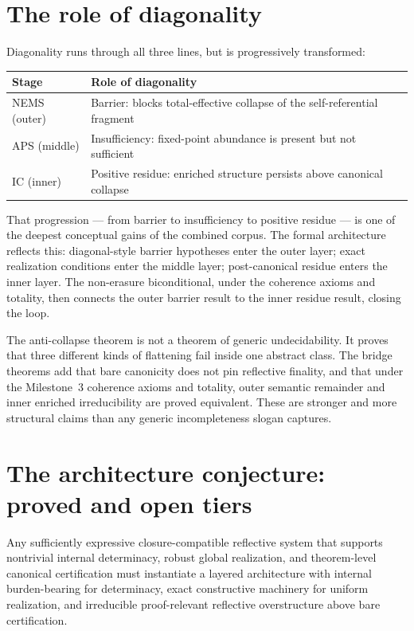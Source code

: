 \documentclass[11pt]{article}
\begin{document}
\section{The role of diagonality}
\label{sec:diagonality}

Diagonality runs through all three lines, but is progressively transformed:

\begin{center}
\begin{tabular}{ll}
\toprule
Stage & Role of diagonality \\
\midrule
NEMS (outer) & Barrier: blocks total-effective collapse of the self-referential fragment \\
APS (middle) & Insufficiency: fixed-point abundance is present but not sufficient \\
IC (inner) & Positive residue: enriched structure persists above canonical collapse \\
\bottomrule
\end{tabular}
\end{center}

That progression --- from barrier to insufficiency to positive residue --- is one of the
deepest conceptual gains of the combined corpus.  The formal architecture reflects this:
diagonal-style barrier hypotheses enter the outer layer; exact realization conditions
enter the middle layer; post-canonical residue enters the inner layer.  The non-erasure
biconditional, under the coherence axioms and totality, then connects the outer barrier
result to the inner residue result, closing the loop.

The anti-collapse theorem is not a theorem of generic undecidability.  It proves that
three different kinds of flattening fail inside one abstract class.  The bridge theorems
add that bare canonicity does not pin reflective finality, and that under the
Milestone~3 coherence axioms and totality, outer semantic remainder and inner enriched
irreducibility are proved equivalent.  These are stronger and more structural claims
than any generic incompleteness slogan captures.

\section{The architecture conjecture: proved and open tiers}
\label{sec:conjecture}

\begin{conjecture}
Any sufficiently expressive closure-compatible reflective system that supports
nontrivial internal determinacy, robust global realization, and theorem-level canonical
certification must instantiate a layered architecture with internal burden-bearing for
determinacy, exact constructive machinery for uniform realization, and irreducible
proof-relevant reflective overstructure above bare certification.
\end{conjecture}
\end{document}
